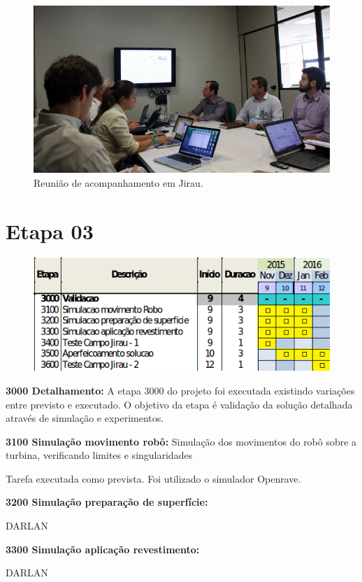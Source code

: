 \begin{figure}\centering
\includegraphics[width=0.9\columnwidth]{figs/img_4836}
\caption{Reunião de acompanhamento em Jirau.}
\end{figure} 

\section{Etapa 03} 

\begin{figure}\centering
\includegraphics[width=0.9\columnwidth]{figs/etapa3}
\end{figure} 

\textbf{3000 Detalhamento:} A etapa 3000 do projeto foi executada existindo
variações entre previsto e executado. O objetivo da etapa é validação da solução
detalhada através de simulação e experimentos.

\textbf{3100 Simulação movimento robô:} 
Simulação dos movimentos do robô sobre a turbina, verificando limites e singularidades

Tarefa executada como prevista. Foi utilizado o simulador Openrave.  

\textbf{3200 Simulação preparação de superfície:}

DARLAN 

\textbf{3300 Simulação aplicação revestimento:}

DARLAN 

